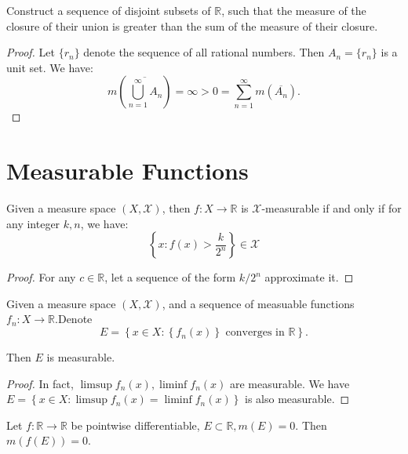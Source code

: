 \begin{problem}
Construct a sequence of disjoint subsets of $ \mathbb{R} $, such that
the measure of the closure of their union is greater than
the sum of the measure of their closure.
\end{problem}

\begin{proof}
	Let $ \{ r_n \} $ denote the sequence of all rational numbers. Then $
		A_n=\{ r_n \}
	$ is a unit set. We have:
	\[
		m\left( \overline{\bigcup_{n=1}^{\infty}{A_n}} \right) =\infty >0=\sum_{n=1}^{\infty}{m(\overline{A_n})}.
	\]
\end{proof}

\section*{Measurable Functions}

\begin{problem}
Given a measure space $ (X,\mathcal{X} ) $, then $ f\colon X\to \mathbb{R} $ is $ \mathcal{X}  $-measurable if and only if for any integer $ k,n $, we have:
$$
	\left\{ x:f( x ) >\frac{k}{2^n} \right\} \in \mathcal{X}
$$
\end{problem}

\begin{proof}
	For any $ c\in \mathbb{R}  $, let a sequence of the form $ k/2^{n} $ approximate it.
\end{proof}

\begin{problem}
Given a measure space $ (X,\mathcal{X} ) $, and a sequence of measuable functions $ f_{n} \colon X\to \mathbb{R} $.Denote
$$
	E=\left\{ x\in X:\left\{ f_n( x )\right\} \text{ converges in } \mathbb{R}  \right\} .
$$

Then $ E $ is measurable.
\end{problem}

\begin{proof}
	In fact, $ \limsup f_{n}(x),\liminf f_{n}(x) $ are measurable. We have $
		E=\left\{ x\in X: \limsup f_{n}(x)=\liminf f_{n}(x)  \right\}
	$ is also measurable.
\end{proof}

\begin{problem} \label{pro:keepmeasure}
Let $ f\colon \mathbb{R} \to \mathbb{R}  $ be pointwise differentiable,
$ E\subset \mathbb{R},m(E)=0  $. Then $ m(f(E))=0 $.
\end{problem}


